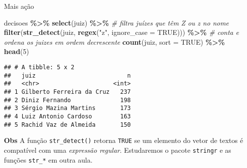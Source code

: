 \documentclass[
  10pt,
  ignorenonframetext,
]{beamer}
\newenvironment{Shaded}{\begin{snugshade}}{\end{snugshade}}
\newcommand{\CommentTok}[1]{\textcolor[rgb]{0.56,0.35,0.01}{\textit{#1}}}
\newcommand{\DataTypeTok}[1]{\textcolor[rgb]{0.13,0.29,0.53}{#1}}
\newcommand{\DecValTok}[1]{\textcolor[rgb]{0.00,0.00,0.81}{#1}}
\newcommand{\KeywordTok}[1]{\textcolor[rgb]{0.13,0.29,0.53}{\textbf{#1}}}
\newcommand{\NormalTok}[1]{#1}
\newcommand{\OperatorTok}[1]{\textcolor[rgb]{0.81,0.36,0.00}{\textbf{#1}}}
\newcommand{\OtherTok}[1]{\textcolor[rgb]{0.56,0.35,0.01}{#1}}
\newcommand{\StringTok}[1]{\textcolor[rgb]{0.31,0.60,0.02}{#1}}
\begin{document}
\begin{frame}[fragile]{Mais ação}
\protect\hypertarget{mais-auxe7uxe3o}{}
\begin{Shaded}
\begin{Highlighting}[]
\NormalTok{decisoes }\OperatorTok{\%\textgreater{}\%}\StringTok{ }
\StringTok{  }\KeywordTok{select}\NormalTok{(juiz) }\OperatorTok{\%\textgreater{}\%}\StringTok{ }
\StringTok{  }\CommentTok{\# filtra juízes que têm \textasciigrave{}Z\textasciigrave{} ou \textasciigrave{}z\textasciigrave{} no nome}
\StringTok{  }\KeywordTok{filter}\NormalTok{(}\KeywordTok{str\_detect}\NormalTok{(juiz, }\KeywordTok{regex}\NormalTok{(}\StringTok{"z"}\NormalTok{, }\DataTypeTok{ignore\_case =} \OtherTok{TRUE}\NormalTok{))) }\OperatorTok{\%\textgreater{}\%}\StringTok{ }
\StringTok{  }\CommentTok{\# conta e ordena os juizes em ordem decrescente}
\StringTok{  }\KeywordTok{count}\NormalTok{(juiz, }\DataTypeTok{sort =} \OtherTok{TRUE}\NormalTok{) }\OperatorTok{\%\textgreater{}\%}
\StringTok{  }\KeywordTok{head}\NormalTok{(}\DecValTok{5}\NormalTok{)}
\end{Highlighting}
\end{Shaded}

\begin{verbatim}
## # A tibble: 5 x 2
##   juiz                          n
##   <chr>                     <int>
## 1 Gilberto Ferreira da Cruz   237
## 2 Diniz Fernando              198
## 3 Sérgio Mazina Martins       173
## 4 Luiz Antonio Cardoso        163
## 5 Rachid Vaz de Almeida       150
\end{verbatim}
\end{frame}

\begin{frame}[fragile]{\textbf{Obs}}
\protect\hypertarget{obs}{}
A função \texttt{str\_detect()} retorna \texttt{TRUE} se um elemento do
vetor de textos é compatível com uma \emph{expressão regular}.
Estudaremos o pacote \texttt{stringr} e as funções \texttt{str\_*} em
outra aula.
\end{frame}
\end{document}
